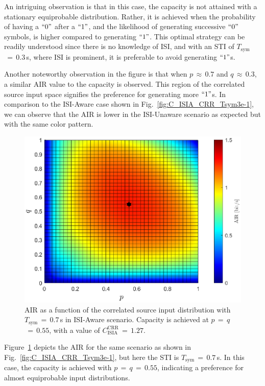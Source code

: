 \documentclass[journal]{IEEEtranTCOM}
\begin{document}
An intriguing observation is that in this case, the capacity is not attained with a stationary equiprobable distribution. Rather, it is achieved when the probability of having a $``0"$ after a $``1"$, and the likelihood of generating successive $``0"$ symbols, is higher compared to generating $``1"$. This optimal strategy can be readily understood since there is no knowledge of ISI, and with an STI of $T_{\mathrm{sym}}$$\,=\,$$0.3$\,s, where ISI is prominent, it is preferable to avoid generating $``1"$s.

Another noteworthy observation in the figure is that when $p$$\,\approx\,$$0.7$ and $q$$\,\approx\,$$0.3$, a similar AIR value to the capacity is observed. This region of the correlated source input space signifies the preference for generating more $``1"$s. In comparison to the ISI-Aware case shown in Fig.~\ref{fig:C_ISIA_CRR_Tsym3e-1}, we can observe that the AIR is lower in the ISI-Unaware scenario as expected but with the same color pattern.
\begin{figure}
    \centering
    \includegraphics[width=1\linewidth]{Figures/ISIA_CRR_Tsym7e-1.eps}
    \caption{AIR as a function of the correlated source input distribution with $T_{\mathrm{sym}}$$\,=\,$$0.7$\,s in ISI-Aware scenario. Capacity is achieved at $p$$\,=\,$$q$$\,=\,$$0.55$, with a value of $C_{\text{ISIA}}^{\text{CRR}}$$\,=\,$$1.27$.}
    \label{fig:C_ISIA_CRR_Tsym7e-1}
\end{figure}
\par Figure~\ref{fig:C_ISIA_CRR_Tsym7e-1} depicts the AIR for the same scenario as shown in Fig.~\ref{fig:C_ISIA_CRR_Tsym3e-1}, but here the STI is $T_{\mathrm{sym}}$$\,=\,$$0.7$\,s. In this case, the capacity is achieved with $p$$\,=\,$$q$$\,=\,$$0.55$, indicating a preference for almost equiprobable input distributions.
\end{document}
